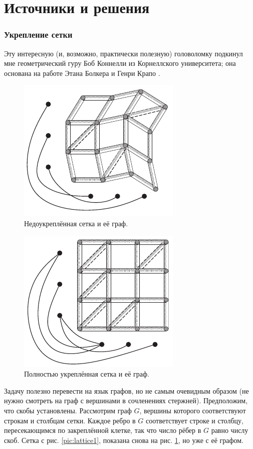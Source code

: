 \section*{Источники и решения}

\subsubsection*{Укрепление сетки}

Эту интересную (и, возможно, практически полезную) головоломку подкинул мне геометрический гуру Боб Коннелли из Корнеллского университета; она основана на работе Этана Болкера и Генри Крапо \cite{8}.


\begin{figure}[ht!]
\centering
\includegraphics[scale=1]{pics/lattice2}
\caption{Недоукреплённая сетка и её граф.}
\label{pic:lattice2}
\end{figure}

\begin{figure}[t!]
\centering
\includegraphics[scale=1]{pics/lattice3}
\caption{Полностью укреплённая сетка и её граф.}
\label{pic:lattice3}
\end{figure}

Задачу полезно перевести на язык графов, но не самым очевидным образом (не нужно смотреть на граф с вершинами в сочленениях стержней).
Предположим, что скобы установлены.
Рассмотрим граф $G$, вершины которого соответствуют строкам и столбцам сетки.
Каждое ребро в $G$ соответствует строке и столбцу, пересекающимся по закреплённой клетке, так что число рёбер в $G$ равно числу скоб.
Сетка с рис. \ref{pic:lattice1}, показана снова на рис. \ref{pic:lattice2}, но уже с её графом.

